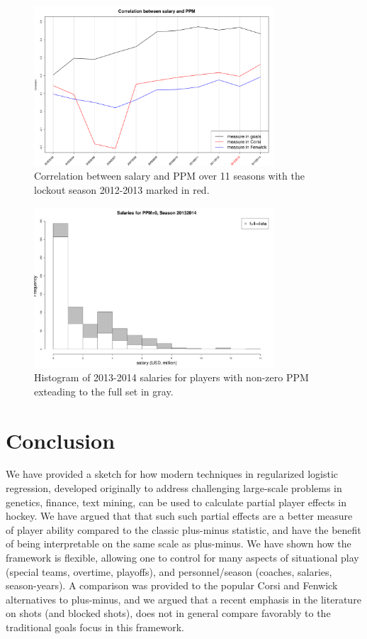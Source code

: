 \begin{figure}[htb!]
    \centering
    \includegraphics[width=0.8\textwidth]{figures/ppmsal-corr-season.pdf}
    \caption{Correlation between salary and PPM over 11 seasons with the lockout season 2012-2013 marked in red.}\label{fig:ppmsal-corr-season}
\end{figure}


\begin{figure}[htb!]
	\centering
	\includegraphics[width=0.8\textwidth]{figures/salaryhist.pdf}
	\caption{Histogram of 2013-2014 salaries for players with non-zero PPM exteading to the full set in gray.}\label{fig:salaryhist}
\end{figure}


\section{Conclusion}\label{sec:conclusion}

We have provided a sketch for how modern techniques in regularized logistic
regression, developed originally to address challenging large-scale problems
in genetics, finance, text mining, can be used to calculate partial player
effects in hockey.  We have argued that that such such partial effects are a
better measure of player ability compared to the classic plus-minus statistic,
and have the benefit of being interpretable on the same scale as plus-minus.
 We have shown
how the framework is flexible, allowing one to control for many aspects of
situational play (special teams, overtime, playoffs), and personnel/season
(coaches, salaries, season-years).  A comparison was provided to the popular
Corsi and Fenwick alternatives to plus-minus, and we argued that a recent
emphasis in the literature on shots (and blocked shots), does not in general
compare favorably to the traditional goals focus in this framework.

